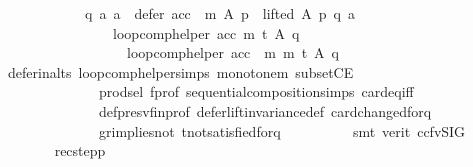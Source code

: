 \begin{isabellebody}
\ \ \ \ \ \ \ \ \ \ \ \ {\isacharparenleft}{\kern0pt}{\isasymforall}q\ a{\isachardot}{\kern0pt}\ {\isacharparenleft}{\kern0pt}a\ {\isasymin}\ {\isacharparenleft}{\kern0pt}defer\ {\isacharparenleft}{\kern0pt}acc\ {\isasymtriangleright}\ m{\isacharparenright}{\kern0pt}\ A\ p{\isacharparenright}{\kern0pt}\ {\isasymand}\ lifted\ A\ p\ q\ a{\isacharparenright}{\kern0pt}\ {\isasymlongrightarrow}\isanewline
\ \ \ \ \ \ \ \ \ \ \ \ \ \ \ \ loop{\isacharunderscore}{\kern0pt}comp{\isacharunderscore}{\kern0pt}helper\ acc\ m\ t\ A\ q\ {\isacharequal}{\kern0pt}\isanewline
\ \ \ \ \ \ \ \ \ \ \ \ \ \ \ \ \ \ loop{\isacharunderscore}{\kern0pt}comp{\isacharunderscore}{\kern0pt}helper\ {\isacharparenleft}{\kern0pt}acc\ {\isasymtriangleright}\ m{\isacharparenright}{\kern0pt}\ m\ t\ A\ q{\isacharparenright}{\kern0pt}{\isachardoublequoteclose}\isanewline
\ \ \ \ \ \ \ \ \isamarkupfalse%
\ defer{\isacharunderscore}{\kern0pt}in{\isacharunderscore}{\kern0pt}alts\ loop{\isacharunderscore}{\kern0pt}comp{\isacharunderscore}{\kern0pt}helper{\isachardot}{\kern0pt}simps{\isacharparenleft}{\kern0pt}{}{\isacharparenright}{\kern0pt}\ monotone{\isacharunderscore}{\kern0pt}m\ subsetCE\isanewline
\ \ \ \ \ \ \ \ \ \ \ \ \ \ prod{\isachardot}{\kern0pt}sel{\isacharparenleft}{\kern0pt}{}{\isacharparenright}{\kern0pt}\ f{\isacharunderscore}{\kern0pt}prof\ sequential{\isacharunderscore}{\kern0pt}composition{\isachardot}{\kern0pt}simps\ card{\isacharunderscore}{\kern0pt}eq{\isacharunderscore}{\kern0pt}{}{\isacharunderscore}{\kern0pt}iff\isanewline
\ \ \ \ \ \ \ \ \ \ \ \ \ \ def{\isacharunderscore}{\kern0pt}presv{\isacharunderscore}{\kern0pt}fin{\isacharunderscore}{\kern0pt}prof\ defer{\isacharunderscore}{\kern0pt}lift{\isacharunderscore}{\kern0pt}invariance{\isacharunderscore}{\kern0pt}def\ card{\isacharunderscore}{\kern0pt}changed{\isacharunderscore}{\kern0pt}for{\isacharunderscore}{\kern0pt}q\isanewline
\ \ \ \ \ \ \ \ \ \ \ \ \ \ gr{\isacharunderscore}{\kern0pt}implies{\isacharunderscore}{\kern0pt}not{}\ t{\isacharunderscore}{\kern0pt}not{\isacharunderscore}{\kern0pt}satisfied{\isacharunderscore}{\kern0pt}for{\isacharunderscore}{\kern0pt}q\isanewline
\ \ \ \ \ \ \ \ \isamarkupfalse%
\ {\isacharparenleft}{\kern0pt}smt\ {\isacharparenleft}{\kern0pt}verit{\isacharcomma}{\kern0pt}\ ccfv{\isacharunderscore}{\kern0pt}SIG{\isacharparenright}{\kern0pt}{\isacharparenright}{\kern0pt}\isanewline
\ \ \ \ \ \ \isamarkupfalse%
\ rec{\isacharunderscore}{\kern0pt}step{\isacharunderscore}{\kern0pt}p{\isacharcolon}{\kern0pt}\isanewline

\end{isabellebody}
